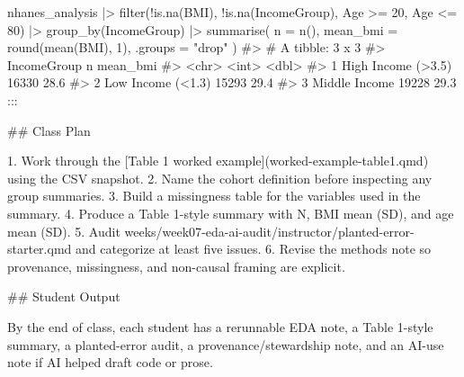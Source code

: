 \documentclass[
  letterpaper,
  DIV=11,
  numbers=noendperiod,
  oneside]{scrreprt}
\newenvironment{Shaded}{\begin{snugshade}}{\end{snugshade}}
\newcommand{\AttributeTok}[1]{\textcolor[rgb]{0.40,0.45,0.13}{#1}}
\newcommand{\CommentTok}[1]{\textcolor[rgb]{0.37,0.37,0.37}{#1}}
\newcommand{\DecValTok}[1]{\textcolor[rgb]{0.68,0.00,0.00}{#1}}
\newcommand{\FunctionTok}[1]{\textcolor[rgb]{0.28,0.35,0.67}{#1}}
\newcommand{\InformationTok}[1]{\textcolor[rgb]{0.37,0.37,0.37}{#1}}
\newcommand{\NormalTok}[1]{\textcolor[rgb]{0.00,0.23,0.31}{#1}}
\newcommand{\OtherTok}[1]{\textcolor[rgb]{0.00,0.23,0.31}{#1}}
\newcommand{\SpecialCharTok}[1]{\textcolor[rgb]{0.37,0.37,0.37}{#1}}
\newcommand{\SpecialStringTok}[1]{\textcolor[rgb]{0.13,0.47,0.30}{#1}}
\newcommand{\StringTok}[1]{\textcolor[rgb]{0.13,0.47,0.30}{#1}}
\begin{document}
\begin{Shaded}
\begin{Highlighting}[numbers=left,,]
\NormalTok{nhanes\_analysis }\SpecialCharTok{|\textgreater{}}
  \FunctionTok{filter}\NormalTok{(}\SpecialCharTok{!}\FunctionTok{is.na}\NormalTok{(BMI), }\SpecialCharTok{!}\FunctionTok{is.na}\NormalTok{(IncomeGroup), Age }\SpecialCharTok{\textgreater{}=} \DecValTok{20}\NormalTok{, Age }\SpecialCharTok{\textless{}=} \DecValTok{80}\NormalTok{) }\SpecialCharTok{|\textgreater{}}
  \FunctionTok{group\_by}\NormalTok{(IncomeGroup) }\SpecialCharTok{|\textgreater{}}
  \FunctionTok{summarise}\NormalTok{(}
    \AttributeTok{n =} \FunctionTok{n}\NormalTok{(),}
    \AttributeTok{mean\_bmi =} \FunctionTok{round}\NormalTok{(}\FunctionTok{mean}\NormalTok{(BMI), }\DecValTok{1}\NormalTok{),}
    \AttributeTok{.groups =} \StringTok{"drop"}
\NormalTok{  )}
\CommentTok{\#\textgreater{} \# A tibble: 3 x 3}
\CommentTok{\#\textgreater{}   IncomeGroup            n mean\_bmi}
\CommentTok{\#\textgreater{}   \textless{}chr\textgreater{}              \textless{}int\textgreater{}    \textless{}dbl\textgreater{}}
\CommentTok{\#\textgreater{} 1 High Income (\textgreater{}3.5) 16330     28.6}
\CommentTok{\#\textgreater{} 2 Low Income (\textless{}1.3)  15293     29.4}
\CommentTok{\#\textgreater{} 3 Middle Income      19228     29.3}
\InformationTok{\textasciigrave{}\textasciigrave{}\textasciigrave{}}
\NormalTok{:::}



\FunctionTok{\#\# Class Plan}

\SpecialStringTok{1. }\NormalTok{Work through the }\CommentTok{[}\OtherTok{Table 1 worked example}\CommentTok{](worked{-}example{-}table1.qmd)}\NormalTok{ using the CSV snapshot.}
\SpecialStringTok{2. }\NormalTok{Name the cohort definition before inspecting any group summaries.}
\SpecialStringTok{3. }\NormalTok{Build a missingness table for the variables used in the summary.}
\SpecialStringTok{4. }\NormalTok{Produce a Table 1{-}style summary with N, BMI mean (SD), and age mean (SD).}
\SpecialStringTok{5. }\NormalTok{Audit }\InformationTok{\textasciigrave{}weeks/week07{-}eda{-}ai{-}audit/instructor/planted{-}error{-}starter.qmd\textasciigrave{}}\NormalTok{ and categorize at least five issues.}
\SpecialStringTok{6. }\NormalTok{Revise the methods note so provenance, missingness, and non{-}causal framing are explicit.}

\FunctionTok{\#\# Student Output}

\NormalTok{By the end of class, each student has a rerunnable EDA note, a Table 1{-}style summary, a planted{-}error audit, a provenance/stewardship note, and an AI{-}use note if AI helped draft code or prose.}


\end{Highlighting}
\end{Shaded}
\end{document}
